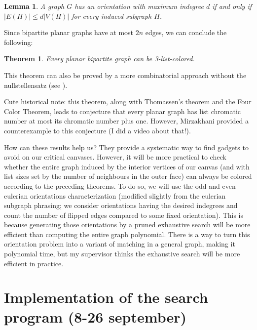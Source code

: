 \documentclass{article}
\newtheorem{theorem}{Theorem}
\newtheorem{lemma}{Lemma}
\begin{document}
\begin{lemma}
A graph $G$ has an orientation with maximum indegree $d$ if and only if $|E(H)| \leq d|V(H)|$ for every induced subgraph $H$.
\end{lemma}

Since bipartite planar graphs have at most $2n$ edges, we can conclude the following:

\begin{theorem}
Every planar bipartite graph can be 3-list-colored.
\end{theorem}

This theorem can also be proved by a more combinatorial approach without the nullstellensatz (see \cite{dvoraknullstellensatz}). 

Cute historical note: this theorem, along with Thomassen's theorem and the Four Color Theorem, leads to conjecture that every planar graph has list chromatic number at most its chromatic number plus one. However, Mirzakhani provided a counterexample to this conjecture (I did a video about that!).

How can these results help us? They provide a systematic way to find gadgets to avoid on our critical canvases. However, it will be more practical to check whether the entire graph induced by the interior vertices of our canvas (and with list sizes set by the number of neighbours in the outer face) can always be colored according to the preceding theorems. To do so, we will use the odd and even eulerian orientations characterization (modified slightly from the eulerian subgraph phrasing; we consider orientations having the desired indegrees and count the number of flipped edges compared to some fixed orientation). This is because generating those orientations by a pruned exhaustive search will be more efficient than computing the entire graph polynomial. There is a way to turn this orientation problem into a variant of matching in a general graph, making it polynomial time, but my supervisor thinks the exhaustive search will be more efficient in practice. 

\section{Implementation of the search program (8-26 september)}

\newpage

\printbibliography
\end{document}

